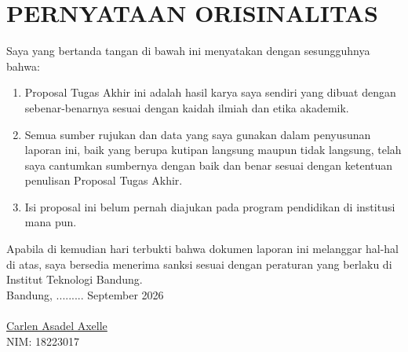 \chapter*{PERNYATAAN ORISINALITAS}
\vspace{2cm}
Saya yang bertanda tangan di bawah ini menyatakan dengan sesungguhnya bahwa:
\begin{enumerate}
    \item Proposal Tugas Akhir ini adalah hasil karya saya sendiri yang dibuat dengan sebenar-benarnya sesuai dengan kaidah ilmiah dan etika akademik.
    \item Semua sumber rujukan dan data yang saya gunakan dalam penyusunan laporan ini, baik yang berupa kutipan langsung maupun tidak langsung, telah saya cantumkan sumbernya dengan baik dan benar sesuai dengan ketentuan penulisan Proposal Tugas Akhir.
    \item Isi proposal ini belum pernah diajukan pada program pendidikan di institusi mana pun.
\end{enumerate}
Apabila di kemudian hari terbukti bahwa dokumen laporan ini melanggar hal-hal di atas, saya bersedia menerima sanksi sesuai dengan peraturan yang berlaku di Institut Teknologi Bandung.
\\[2cm]
Bandung, ......... September 2026\\
\\[2cm]

\underline{Carlen Asadel Axelle} \\
NIM: 18223017
  